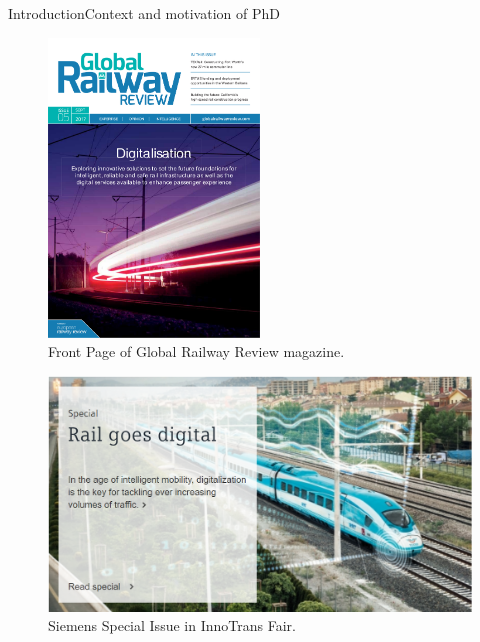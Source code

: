 \begin{frame}{Introduction}{Context and motivation of PhD}
	
	
	\begin{minipage}[t]{0.48\linewidth}

		\begin{figure}[ht!]
			\centering
			\includegraphics[width=0.5\textwidth,keepaspectratio]{figures/1.Intro/grr_magazine_10}
			\caption{Front Page of Global Railway Review magazine.}
		\end{figure}
	\end{minipage}\hfill
	\begin{minipage}[t]{0.48\linewidth}
		
\vspace{2em}
		\begin{figure}[ht!]
			\centering
			\includegraphics[width=1\textwidth,keepaspectratio]{figures/1.Intro/siemens}
			\caption{Siemens Special Issue in InnoTrans Fair.}
		\end{figure}
		

\end{minipage}
\end{frame}
